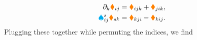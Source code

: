 \begin{subequations}
\begin{align}
 \label{eq:ConnCoeffSymOne}
 \partial_{k} \textcolor{orange}{\blacklozenge}_{ij}
 &= \textcolor{orange}{\blacklozenge}_{ijk} + \textcolor{orange}{\blacklozenge}_{jik},
\\ 
 \label{eq:ConnCoeffSymTwo}
 \textcolor{cyan}{\spadesuit}^{s}_{ij} \textcolor{orange}{\blacklozenge}_{sk}
 &= \textcolor{orange}{\blacklozenge}_{kji} - \textcolor{orange}{\blacklozenge}_{kij}.
\end{align} 
\end{subequations}
Plugging these together while permuting the indices, we find
